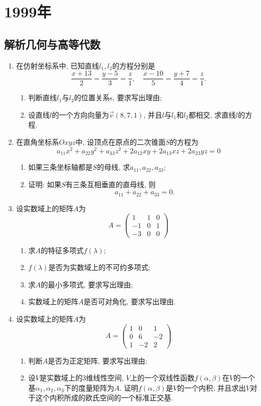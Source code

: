\documentclass[12pt,a4paper,openany]{book}
\begin{document}
\section{1999年}
\subsection{解析几何与高等代数}
\begin{enumerate}
\item 在仿射坐标系中, 已知直线$l_1, l_2$的方程分别是
\[
\frac{x+13}{2} = \frac{y-5}{3} = \frac{z}{1}, \quad  \frac{x-10}{5} = \frac{y+7}{4} = \frac{z}{1}.
\]
\begin{enumerate}
\item 判断直线$l_1$与$l_2$的位置关系s, 要求写出理由;
\item 设直线$l$的一个方向向量为$\vec{v}(8, 7, 1)$, 并且$l$与$l_1$和$l_2$都相交, 求直线$l$的方程.
\end{enumerate}

\item 在直角坐标系$Oxyz$中, 设顶点在原点的二次锥面$S$的方程为
\[
a_{11}x^2 + a_{22}y^2 + a_{33}z^2 + 2a_{12}xy + 2a_{13}xz + 2a_{23}yz = 0
\]
\begin{enumerate}
\item 如果三条坐标轴都是$S$的母线, 求$a_{11}, a_{22}, a_{33}$;
\item 证明: 如果$S$有三条互相垂直的直母线, 则
\[
a_{11} + a_{22} + a_{33} = 0.
\]
\end{enumerate}

\item 设实数域上的矩阵$A$为
\[
A = \begin{pmatrix}
1 & 1 & 0 \\
-1 & 0 & 1 \\
-3 & 0 & 0
\end{pmatrix}
\]
\begin{enumerate}
\item 求$A$的特征多项式$f(\lambda)$;
\item $f(\lambda)$是否为实数域上的不可约多项式;
\item 求$A$的最小多项式, 要求写出理由;
\item 实数域上的矩阵$A$是否可对角化, 要求写出理由.
\end{enumerate}

\item 设实数域上的矩阵$A$为
\[
A = \begin{pmatrix}
1 & 0 & 1 \\
0 & 6 & -2 \\
1 & -2 & 2
\end{pmatrix}
\]
\begin{enumerate}
\item 判断$A$是否为正定矩阵, 要求写出理由;
\item 设$V$是实数域上的3维线性空间, $V$上的一个双线性函数$f(\alpha, \beta)$在$V$的一个基$\alpha_1, \alpha_2, \alpha_3$下的度量矩阵为$A$. 证明$f(\alpha, \beta)$是$V$的一个内积; 并且求出$V$对于这个内积所成的欧氏空间的一个标准正交基.
\end{enumerate}


\end{enumerate}
\end{document}
